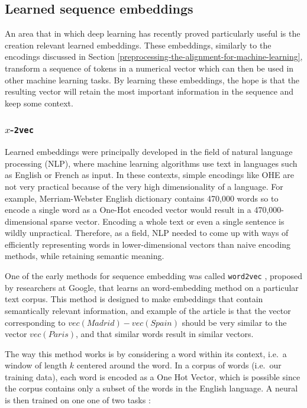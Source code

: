 \documentclass[
  11pt,
  twoside,
  BCOR=10mm,
  listof=totoc]{scrbook}
\begin{document}
\hypertarget{learned-sequence-embeddings}{%
\subsection{Learned sequence embeddings}\label{learned-sequence-embeddings}}

An area that in which deep learning has recently proved particularly useful is the creation relevant learned embeddings. These embeddings, similarly to the encodings discussed in Section \ref{preprocessing-the-alignment-for-machine-learning}, transform a sequence of tokens in a numerical vector which can then be used in other machine learning tasks. By learning these embeddings, the hope is that the resulting vector will retain the most important information in the sequence and keep some context.

\hypertarget{x-2vec}{%
\subsubsection{\texorpdfstring{\(x\)-\texttt{2vec}}{x-2vec}}\label{x-2vec}}

Learned embeddings were principally developed in the field of natural language processing (NLP), where machine learning algorithms use text in languages such as English or French as input. In these contexts, simple encodings like OHE are not very practical because of the very high dimensionality of a language. For example, Merriam-Webster English dictionary contains 470,000 words \autocite{HowManyWords} so to encode a single word as a One-Hot encoded vector would result in a 470,000-dimensional sparse vector. Encoding a whole text or even a single sentence is wildly unpractical. Therefore, as a field, NLP needed to come up with ways of efficiently representing words in lower-dimensional vectors than naive encoding methods, while retaining semantic meaning.

One of the early methods for sequence embedding was called \texttt{word2vec} \autocite{mikolovEfficientEstimationWord2013,mikolovDistributedRepresentationsWords2013}, proposed by researchers at Google, that learns an word-embedding method on a particular text corpus. This method is designed to make embeddings that contain semantically relevant information, and example of the article is that the vector corresponding to \(vec(Madrid) - vec(Spain)\) should be very similar to the vector \(vec(Paris)\), and that similar words result in similar vectors.

The way this method works is by considering a word within its context, i.e.~a window of length \(k\) centered around the word. In a corpus of words (i.e.~our training data), each word is encoded as a One Hot Vector, which is possible since the corpus contains only a subset of the words in the English language. A neural is then trained on one one of two tasks \autocite{goldbergWord2vecExplainedDeriving2014}:
\end{document}
